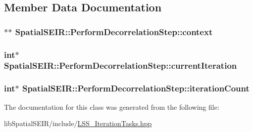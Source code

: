 \subsection{Member Data Documentation}
\hypertarget{classSpatialSEIR_1_1PerformDecorrelationStep_ad02138912341efd070e7f38a6743f014}{
\subsubsection[{context}]{$\ast$$\ast$ Spatial\-S\-E\-I\-R\-::\-Perform\-Decorrelation\-Step\-::context}}\label{classSpatialSEIR_1_1PerformDecorrelationStep_ad02138912341efd070e7f38a6743f014}
\hypertarget{classSpatialSEIR_1_1PerformDecorrelationStep_aeb81e294b08d0665e22b5c92e94075de}{
\subsubsection[{current\-Iteration}]{\setlength{\rightskip}{0pt plus 5cm}int$\ast$ Spatial\-S\-E\-I\-R\-::\-Perform\-Decorrelation\-Step\-::current\-Iteration}}\label{classSpatialSEIR_1_1PerformDecorrelationStep_aeb81e294b08d0665e22b5c92e94075de}
\hypertarget{classSpatialSEIR_1_1PerformDecorrelationStep_a78eb6b88ca3e77d7cb482ad30bbfa552}{
\subsubsection[{iteration\-Count}]{\setlength{\rightskip}{0pt plus 5cm}int$\ast$ Spatial\-S\-E\-I\-R\-::\-Perform\-Decorrelation\-Step\-::iteration\-Count}}\label{classSpatialSEIR_1_1PerformDecorrelationStep_a78eb6b88ca3e77d7cb482ad30bbfa552}


The documentation for this class was generated from the following file\-:\begin{DoxyCompactItemize}
\item 
lib\-Spatial\-S\-E\-I\-R/include/\hyperlink{LSS__IterationTasks_8hpp}{L\-S\-S\-\_\-\-Iteration\-Tasks.\-hpp}\end{DoxyCompactItemize}
